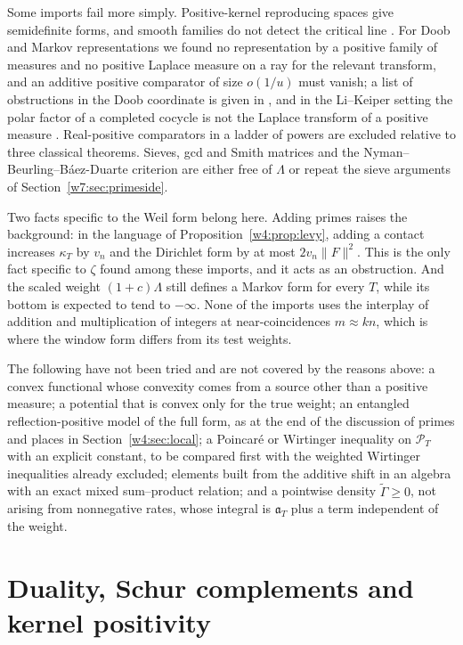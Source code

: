 \documentclass[11pt]{amsart}
\theoremstyle{definition}
\theoremstyle{remark}
\numberwithin{equation}{section}
\newcommand{\PT}{\mathcal{P}_T}                        %
\newcommand{\aT}{\mathfrak{a}_T}                       %
\begin{document}
Some imports fail more simply. Positive-kernel reproducing spaces give semidefinite forms, and smooth families do not
detect the critical line \cite[Theorems~5.1--5.3]{P18}. For Doob and Markov representations we found no representation
by a positive family of measures and no positive Laplace measure on a ray for the relevant transform, and an additive
positive comparator of size $o(1/u)$ must vanish; a list of obstructions in the Doob coordinate is given in \cite{P41},
and in the Li--Keiper setting the polar factor of a completed cocycle is not the Laplace transform of a positive measure
\cite[Proposition~3.6]{P37}. Real-positive comparators in a ladder of powers are excluded relative to three classical
theorems. Sieves, gcd and Smith matrices and the Nyman--Beurling--B\'aez-Duarte criterion are either free of $\Lambda$
or repeat the sieve arguments of Section~\ref{w7:sec:primeside}.

Two facts specific to the Weil form belong here. Adding primes raises the background: in the language of
Proposition~\ref{w4:prop:levy}, adding a contact increases $\kappa_T$ by $v_n$ and the Dirichlet form by at most
$2v_n\|F\|^2$. This is the only fact specific to $\zeta$ found among these imports, and it acts as an obstruction. And
the scaled weight $(1+c)\Lambda$ still defines a Markov form for every $T$, while its bottom is expected to tend to
$-\infty$. None of the imports uses the interplay of addition and multiplication of integers at near-coincidences
$m\approx kn$, which is where the window form differs from its test weights.

The following have not been tried and are not covered by the reasons above: a convex functional whose convexity comes
from a source other than a positive measure; a potential that is convex only for the true weight; an entangled
reflection-positive model of the full form, as at the end of the discussion of primes and places in
Section~\ref{w4:sec:local}; a Poincar\'e or Wirtinger inequality on $\PT$ with an explicit constant, to be compared first
with the weighted Wirtinger inequalities already excluded; elements built from the additive shift in an algebra with an
exact mixed sum--product relation; and a pointwise density $\tilde\Gamma\ge0$, not arising from nonnegative rates, whose
integral is $\aT$ plus a term independent of the weight.

\section{Duality, Schur complements and kernel positivity}\label{w5:sec:dual}
\end{document}
